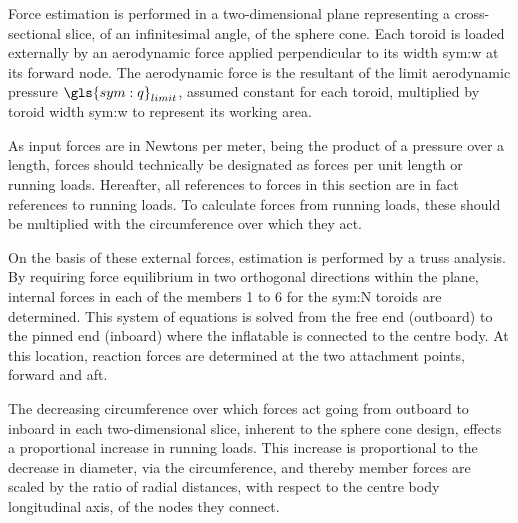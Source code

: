 Force estimation is performed in a two-dimensional plane representing a cross-sectional slice, of an infinitesimal angle, of the sphere cone. Each toroid is loaded externally by an aerodynamic force applied perpendicular to its width \gls{sym:w} at its forward node. The aerodynamic force is the resultant of the limit aerodynamic pressure $\gls{sym:q}_{limit}$, assumed constant for each toroid, multiplied by toroid width \gls{sym:w} to represent its working area. 


As input forces are in Newtons per meter, being the product of a pressure over a length, forces should technically be designated as forces per unit length or running loads. Hereafter, all references to forces in this section are in fact references to running loads. To calculate forces from running loads, these should be multiplied with the circumference over which they act.

On the basis of these external forces, estimation is performed by a truss analysis. By requiring force equilibrium in two orthogonal directions within the plane, internal forces in each of the members 1 to 6 for the \gls{sym:N} toroids are determined. This system of equations is solved from the free end (outboard) to the pinned end (inboard) where the inflatable is connected to the centre body. At this location, reaction forces are determined at the two attachment points, forward and aft.

The decreasing circumference over which forces act going from outboard to inboard in each two-dimensional slice, inherent to the sphere cone design, effects a proportional increase in running loads. This increase is proportional to the decrease in diameter, via the circumference, and thereby member forces are scaled by the ratio of radial distances, with respect to the centre body longitudinal axis, of the nodes they connect.

